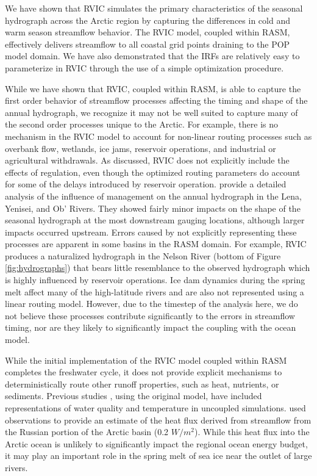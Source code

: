 \documentclass[jgrga, draft]{agutex}
\begin{document}
\begin{article}
We have shown that RVIC simulates the primary characteristics of the seasonal hydrograph across the Arctic region by capturing the differences in cold and warm season streamflow behavior.
The RVIC model, coupled within RASM, effectively delivers streamflow to all coastal grid points draining to the POP model domain.
We have also demonstrated that the IRFs are relatively easy to parameterize in RVIC through the use of a simple optimization procedure.

While we have shown that RVIC, coupled within RASM, is able to capture the first order behavior of streamflow processes affecting the timing and shape of the annual hydrograph, we recognize it may not be well suited to capture many of the second order processes unique to the Arctic.
For example, there is no mechanism in the RVIC model to account for non-linear routing processes such as overbank flow, wetlands, ice jams, reservoir operations, and industrial or agricultural withdrawals.
As discussed, RVIC does not explicitly include the effects of regulation, even though the optimized routing parameters do account for some of the delays introduced by reservoir operation.
\citet{Adam_2007} provide a detailed analysis of the influence of management on the annual hydrograph in the Lena, Yenisei, and Ob' Rivers.
They showed fairly minor impacts on the shape of the seasonal hydrograph at the most downstream gauging locations, although larger impacts occurred upstream.
Errors caused by not explicitly representing these processes are apparent in some basins in the RASM domain.
For example, RVIC produces a naturalized hydrograph in the Nelson River (bottom of Figure \ref{fig:hydrographs}) that bears little resemblance to the observed hydrograph which is highly influenced by reservoir operations.
Ice dam dynamics during the spring melt affect many of the high-latitude rivers and are also not represented using a linear routing model.
However, due to the timestep of the analysis here, we do not believe these processes contribute significantly to the errors in streamflow timing, nor are they likely to significantly impact the coupling with the ocean model.

While the initial implementation of the RVIC model coupled within RASM completes the freshwater cycle, it does not provide explicit mechanisms to deterministically route other runoff properties, such as heat, nutrients, or sediments.
Previous studies \citep[e.g.][]{vanVliet_2011,vanVliet_2012}, using the original \citet{Lohmann_1996} model, have included representations of water quality and temperature in uncoupled simulations.
\citet{Lammers_2007} used observations to provide an estimate of the heat flux derived from streamflow from the Russian portion of the Arctic basin (0.2 $W/m^2$).
While this heat flux into the Arctic ocean is unlikely to significantly impact the regional ocean energy budget, it may play an important role in the spring melt of sea ice near the outlet of large rivers.


\end{article}
\end{document}
